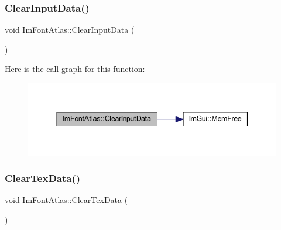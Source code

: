 \subsubsection{\texorpdfstring{Clear\+Input\+Data()}{ClearInputData()}}
{\footnotesize\ttfamily void Im\+Font\+Atlas\+::\+Clear\+Input\+Data (\begin{DoxyParamCaption}{ }\end{DoxyParamCaption})}

Here is the call graph for this function\+:
\nopagebreak
\begin{figure}[H]
\begin{center}
\leavevmode
\includegraphics[width=344pt]{struct_im_font_atlas_a3f5bcbb7a2683b1af106fcf4e1217662_cgraph}
\end{center}
\end{figure}
\mbox{\label{struct_im_font_atlas_a3ede4bd513bec044c77ac392ad9c6e86}} 
\subsubsection{\texorpdfstring{Clear\+Tex\+Data()}{ClearTexData()}}
{\footnotesize\ttfamily void Im\+Font\+Atlas\+::\+Clear\+Tex\+Data (\begin{DoxyParamCaption}{ }\end{DoxyParamCaption})}

